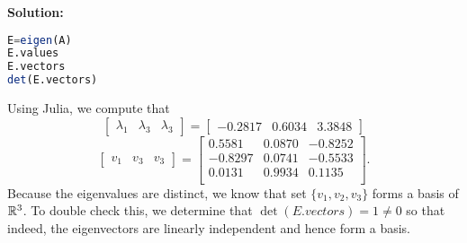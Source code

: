 \documentclass[letterpaper]{book}
\begin{document}
\textbf{Solution:} 
\begin{lstlisting}[language=Julia,style=mystyle]
E=eigen(A)
E.values
E.vectors
det(E.vectors)
\end{lstlisting}
Using Julia, we compute that 
\begin{equation}
\left[
\begin{array}{rrr}
\lambda_1&
\lambda_3 &
\lambda_3
\end{array}
\right] =\left[
\begin{array}{rrr}
-0.2817 &
0.6034 &
3.3848 
\end{array}
\right]
\end{equation}
\begin{equation}\left[
\begin{array}{rrr}
v_1&
v_3 &
v_3
\end{array}
\right] =
\left[
\begin{array}{rrr}
0.5581 & 0.0870 & -0.8252 \\
-0.8297 & 0.0741 & -0.5533 \\
0.0131 & 0.9934 & 0.1135 \\
\end{array}
\right].
\end{equation}
Because the eigenvalues are distinct, we know that set $\{v_1, v_2, v_3 \}$ forms a basis of $\mathbb R^3$. To double check this, we determine that $\det(E.vectors)=1 \neq 0$ so that indeed, the eigenvectors are linearly independent and hence form a basis. 
\Qed

\newpage
\end{document}
